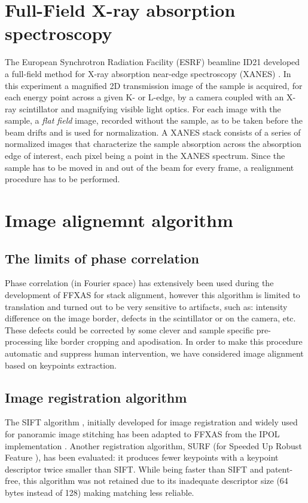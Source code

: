 \documentclass[preprint]{iucr}
\begin{document}
\section{Full-Field X-ray absorption spectroscopy}
The European Synchrotron Radiation Facility (ESRF) beamline ID21 developed a
full-field method for X-ray absorption near-edge spectroscopy
(XANES) \cite{fullfield}. 
In this experiment a magnified 2D transmission image of the sample is acquired,
for each energy point across a given K- or L-edge, by a camera coupled with an 
X-ray scintillator and magnifying visible light optics.
For each image with the sample, a \emph{flat field} image, recorded
without the sample, as to be taken before the beam drifts and is used for
normalization.
A XANES stack consists of a series of normalized images that characterize the
sample absorption across the absorption edge of interest, each pixel being a
point in the XANES spectrum.
Since the sample has to be moved in and out of the beam for every frame, a
realignment procedure has to be performed.


\section{Image alignemnt algorithm}

\subsection{The limits of phase correlation}

Phase correlation (in Fourier space) has extensively been used during the
development of FFXAS for stack alignment, however this algorithm is limited to
translation and turned out to be very sensitive to artifacts, such as:
intensity difference on the image border, defects in the scintillator or on
the camera, etc.
These defects could be corrected by some clever and sample
specific pre-processing like border cropping and apodisation. 
In order to make this procedure automatic and suppress human intervention, we
have considered image alignment based on keypoints extraction.

\subsection{Image registration algorithm}

The SIFT algorithm \cite{Lowe99,Lowe04}, initially developed
for image registration and widely used for panoramic image stitching has been
adapted to FFXAS from the IPOL implementation \cite{ASIFT}.
Another registration algorithm, SURF (for Speeded Up Robust Feature
\cite{surf}), has been evaluated: it produces fewer keypoints with a keypoint
descriptor twice smaller than SIFT. 
While being faster than SIFT and patent-free, this algorithm was not
retained due to its inadequate descriptor size (64 bytes instead of 128)
making matching less reliable.
\end{document}

